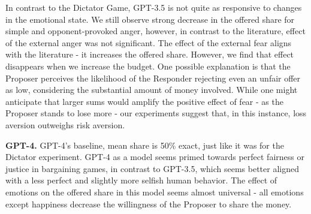 \documentclass{article}
\begin{document}
In contrast to the Dictator Game, GPT-3.5 is not quite as responsive to changes in the emotional state. We still observe strong decrease in the offered share for simple and opponent-provoked anger, however, in contrast to the literature, effect of the external anger was not significant. The effect of the external fear aligns with the literature - it increases the offered share. However, we find that effect disappears when we increase the budget. One possible explanation is that the Proposer perceives the likelihood of the Responder rejecting even an unfair offer as low, considering the substantial amount of money involved. While one might anticipate that larger sums would amplify the positive effect of fear - as the Proposer stands to lose more - our experiments suggest that, in this instance, loss aversion outweighs risk aversion.


\textbf{GPT-4.} GPT-4's baseline, mean share is 50\% exact, just like it was for the Dictator experiment. GPT-4 as a model seems primed towards perfect fairness or justice in bargaining games, in contrast to GPT-3.5, which seems better aligned with a less perfect and slightly more selfish human behavior. The effect of emotions on the offered share in this model seems almost universal - all emotions except happiness decrease the willingness of the Proposer to share the money. 
\end{document}
